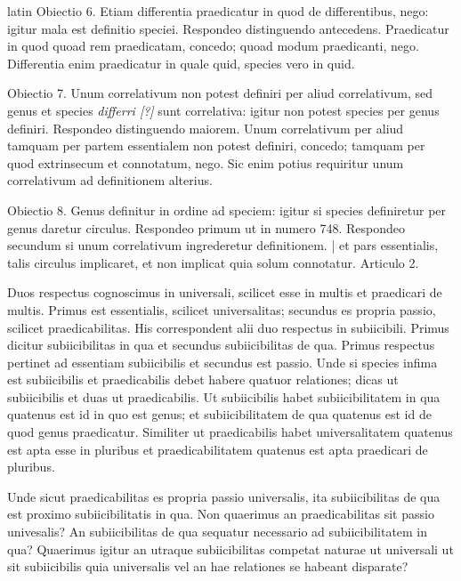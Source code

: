 \begin{otherlanguage*}{latin}
\pstart
Obiectio 6. Etiam differentia praedicatur in quod de differentibus, nego:
igitur mala est definitio speciei. Respondeo distinguendo antecedens. Praedicatur in quod quoad rem praedicatam, concedo; quoad modum praedicanti, nego. Differentia enim praedicatur in quale quid, species vero in quid. 
\pend

\pstart
Obiectio 7. Unum correlativum non potest definiri per aliud correlativum, sed genus et species \emph{differri [?]} sunt correlativa:
igitur non potest species per genus definiri. Respondeo distinguendo maiorem. Unum correlativum per aliud tamquam per partem essentialem non potest definiri, concedo; tamquam per quod extrinsecum et connotatum, nego. Sic enim potius requiritur unum correlativum ad definitionem alterius. 
\pend

\pstart
Obiectio 8. Genus definitur in ordine ad speciem:
igitur si species definiretur per genus daretur circulus. Respondeo primum ut in numero 748. Respondeo secundum si unum correlativum ingrederetur definitionem. \textnormal{|} et pars essentialis, talis circulus implicaret, et non implicat quia solum connotatur. Articulo 2. 
\pend

\pstart
{}
\pend

\pstart
Duos respectus cognoscimus in universali, scilicet esse in multis et praedicari de multis. Primus est essentialis, scilicet universalitas; secundus es propria passio, scilicet praedicabilitas. His correspondent alii duo respectus in subiicibili. Primus dicitur subiicibilitas in qua et secundus subiicibilitas de qua. Primus respectus pertinet ad essentiam subiicibilis et secundus est passio. Unde si species infima est subiicibilis et praedicabilis debet habere quatuor relationes; dicas ut subiicibilis et duas ut praedicabilis. Ut subiicibilis habet subiicibilitatem in qua quatenus est id in quo est genus; et subiicibilitatem de qua quatenus est id de quod genus praedicatur. Similiter ut praedicabilis habet universalitatem quatenus est apta esse in pluribus et praedicabilitatem quatenus est apta praedicari de pluribus. 
\pend

\pstart
Unde sicut praedicabilitas es propria passio universalis, ita subiicibilitas de qua est proximo subiicibilitatis in qua. Non quaerimus an praedicabilitas sit passio univesalis? An subiicibilitas de qua sequatur necessario ad subiicibilitatem in qua? Quaerimus igitur an utraque subiicibilitas competat naturae ut universali ut sit subiicibilis quia universalis vel an hae relationes se habeant disparate? 
\pend


\end{otherlanguage*}
